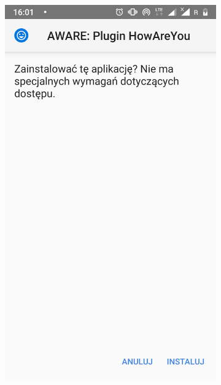 \begin{enumerate}
	\begin{figure}[H]
		\centering
		\begin{subfigure}{0.35\textwidth}
			\centering
			\includegraphics[scale=0.13]{dodatekA/2_8.png}
			\subcaption{\label{subfigure_a}}
		\end{subfigure}
		\begin{subfigure}{0.35\textwidth}
			\centering

\end{subfigure}
\end{figure}
\end{enumerate}
